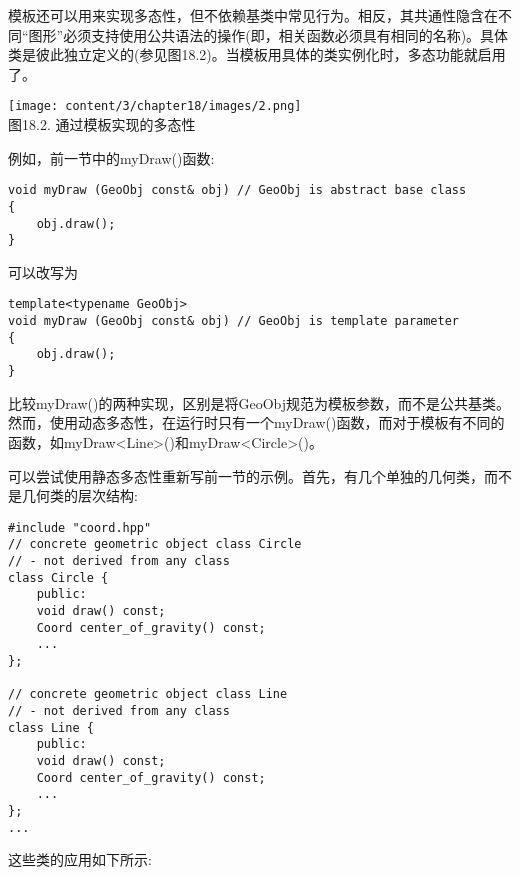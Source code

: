 
模板还可以用来实现多态性，但不依赖基类中常见行为。相反，其共通性隐含在不同“图形”必须支持使用公共语法的操作(即，相关函数必须具有相同的名称)。具体类是彼此独立定义的(参见图18.2)。当模板用具体的类实例化时，多态功能就启用了。

\begin{center}
\texttt{[image: content/3/chapter18/images/2.png]} \\
图18.2. 通过模板实现的多态性
\end{center}

例如，前一节中的myDraw()函数:

\begin{lstlisting}[style=styleCXX]
void myDraw (GeoObj const& obj) // GeoObj is abstract base class
{
	obj.draw();
}
\end{lstlisting}

可以改写为

\begin{lstlisting}[style=styleCXX]
template<typename GeoObj>
void myDraw (GeoObj const& obj) // GeoObj is template parameter
{
	obj.draw();
}
\end{lstlisting}

比较myDraw()的两种实现，区别是将GeoObj规范为模板参数，而不是公共基类。然而，使用动态多态性，在运行时只有一个myDraw()函数，而对于模板有不同的函数，如myDraw<Line>()和myDraw<Circle>()。

可以尝试使用静态多态性重新写前一节的示例。首先，有几个单独的几何类，而不是几何类的层次结构:

\begin{lstlisting}[style=styleCXX]
#include "coord.hpp"
// concrete geometric object class Circle
// - not derived from any class
class Circle {
	public:
	void draw() const;
	Coord center_of_gravity() const;
	...
};

// concrete geometric object class Line
// - not derived from any class
class Line {
	public:
	void draw() const;
	Coord center_of_gravity() const;
	...
};
...
\end{lstlisting}

这些类的应用如下所示:

